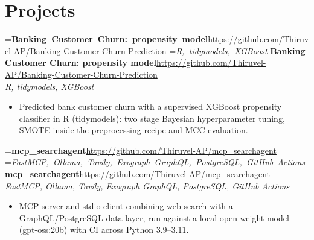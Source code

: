 \documentclass[a4paper,11pt]{article}
\newcommand{\project}[3]{%
  \textbf{#1}\hfill#3\\ {\color{muted}\small\textit{#2}}\par}
\newcommand{\gap}{\vspace{5pt}}
\begin{document}
\section{Projects}
=\hbox{\textbf{Banking Customer Churn: propensity model}\hspace{1em}\url{https://github.com/Thiruvel-AP/Banking-Customer-Churn-Prediction}}%
=\hbox{{\small\textit{R, tidymodels, XGBoost}}}%
\ifdim\wd0>\linewidth
\ifdim\wd2>\linewidth
\textbf{Banking Customer Churn: propensity model}\\ {\color{muted}\small\textit{R, tidymodels, XGBoost}}\\ \hfill{\small\url{https://github.com/Thiruvel-AP/Banking-Customer-Churn-Prediction}}\par
\else
\textbf{Banking Customer Churn: propensity model}\\ {\color{muted}\small\textit{R, tidymodels, XGBoost}}\hfill{\small\url{https://github.com/Thiruvel-AP/Banking-Customer-Churn-Prediction}}\par
\fi
\else
\project{Banking Customer Churn: propensity model}{R, tidymodels, XGBoost}{\url{https://github.com/Thiruvel-AP/Banking-Customer-Churn-Prediction}}
\fi
\begin{itemize}
  \item Predicted bank customer churn with a supervised XGBoost propensity classifier in R (tidymodels): two stage Bayesian hyperparameter tuning, SMOTE inside the preprocessing recipe and MCC evaluation.
\end{itemize}
\gap
{}
=\hbox{\textbf{mcp\_searchagent}\hspace{1em}\url{https://github.com/Thiruvel-AP/mcp_searchagent}}%
=\hbox{{\small\textit{FastMCP, Ollama, Tavily, Exograph GraphQL, PostgreSQL, GitHub Actions}}}%
\ifdim\wd0>\linewidth
\ifdim\wd2>\linewidth
\textbf{mcp\_searchagent}\\ {\color{muted}\small\textit{FastMCP, Ollama, Tavily, Exograph GraphQL, PostgreSQL, GitHub Actions}}\\ \hfill{\small\url{https://github.com/Thiruvel-AP/mcp_searchagent}}\par
\else
\textbf{mcp\_searchagent}\\ {\color{muted}\small\textit{FastMCP, Ollama, Tavily, Exograph GraphQL, PostgreSQL, GitHub Actions}}\hfill{\small\url{https://github.com/Thiruvel-AP/mcp_searchagent}}\par
\fi
\else
\project{mcp\_searchagent}{FastMCP, Ollama, Tavily, Exograph GraphQL, PostgreSQL, GitHub Actions}{\url{https://github.com/Thiruvel-AP/mcp_searchagent}}
\fi
\begin{itemize}
  \item MCP server and stdio client combining web search with a GraphQL/PostgreSQL data layer, run against a local open weight model (gpt-oss:20b) with CI across Python 3.9–3.11.
\end{itemize}
\end{document}
